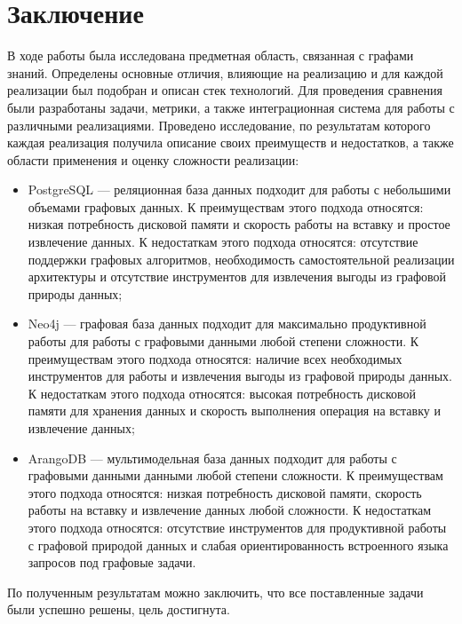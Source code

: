 \chapter*{Заключение}

В ходе работы была исследована предметная область, связанная с графами знаний. Определены основные отличия, влияющие на реализацию и для каждой реализации был подобран и описан стек технологий. Для проведения сравнения были разработаны задачи, метрики, а также интеграционная система для работы с различными реализациями. Проведено исследование, по результатам которого каждая реализация получила описание своих преимуществ и недостатков, а также области применения и оценку сложности реализации:

\begin{itemize}
    \item PostgreSQL — реляционная база данных подходит для работы с небольшими объемами графовых данных. К преимуществам этого подхода относятся: низкая потребность дисковой памяти и скорость работы на вставку и простое извлечение данных. К недостаткам этого подхода относятся: отсутствие поддержки графовых алгоритмов, необходимость самостоятельной реализации архитектуры и отсутствие инструментов для извлечения выгоды из графовой природы данных;
    \item Neo4j — графовая база данных подходит для максимально продуктивной работы для работы с графовыми данными любой степени сложности. К преимуществам этого подхода относятся: наличие всех необходимых инструментов для работы и извлечения выгоды из графовой природы данных. К недостаткам этого подхода относятся: высокая потребность дисковой памяти для хранения данных и скорость выполнения операция на вставку и извлечение данных;
    \item ArangoDB — мультимодельная база данных подходит для работы с графовыми данными данными любой степени сложности. К преимуществам этого подхода относятся: низкая потребность дисковой памяти, скорость работы на вставку и извлечение данных любой сложности. К недостаткам этого подхода относятся: отсутствие инструментов для продуктивной работы с графовой природой данных и слабая ориентированность встроенного языка запросов под графовые задачи.
\end{itemize}

По полученным результатам можно заключить, что все поставленные задачи были успешно решены, цель достигнута.
